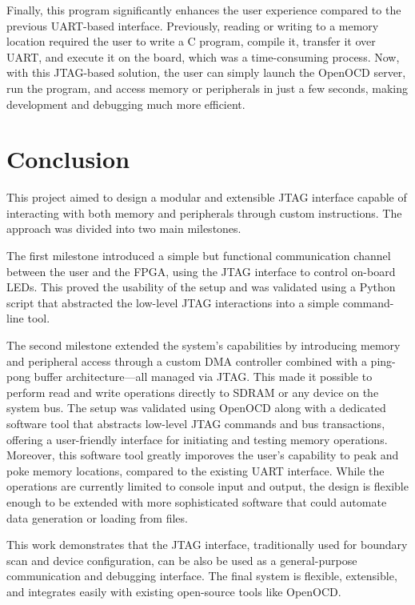 \documentclass[a4paper,11pt,oneside]{report}
\begin{document}
Finally, this program significantly enhances the user experience compared to the previous UART-based interface. 
Previously, reading or writing to a memory location required the user to write a C program, compile it, transfer it over UART, and execute it on the board, which was a time-consuming process. 
Now, with this JTAG-based solution, the user can simply launch the OpenOCD server, run the program, and access memory or peripherals in just a few seconds, making development and debugging much more efficient.

\chapter{Conclusion}

This project aimed to design a modular and extensible JTAG interface capable of interacting with both memory and peripherals through custom instructions. The approach was divided into two main milestones.

The first milestone introduced a simple but functional communication channel between the user and the FPGA, using the JTAG interface to control on-board LEDs. 
This proved the usability of the setup and was validated using a Python script that abstracted the low-level JTAG interactions into a simple command-line tool.

The second milestone extended the system’s capabilities by introducing memory and peripheral access through a custom DMA controller combined with a ping-pong buffer architecture—all managed via JTAG.
This made it possible to perform read and write operations directly to SDRAM or any device on the system bus. 
The setup was validated using OpenOCD along with a dedicated software tool that abstracts low-level JTAG commands and bus transactions, offering a user-friendly interface for initiating and testing memory operations.
Moreover, this software tool greatly imporoves the user's capability to peak and poke memory locations, compared to the existing UART interface.
While the operations are currently limited to console input and output, the design is flexible enough to be extended with more sophisticated software that could automate data generation or loading from files.

This work demonstrates that the JTAG interface, traditionally used for boundary scan and device configuration, can be also be used as a general-purpose communication and debugging interface. 
The final system is flexible, extensible, and integrates easily with existing open-source tools like OpenOCD.
\end{document}
